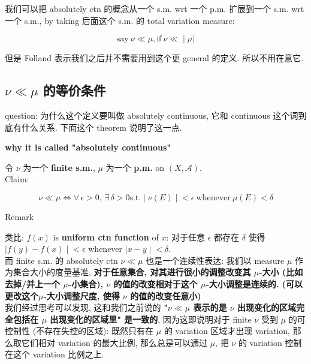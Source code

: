 \documentclass{qlnotes-export}
\begin{document}
我们可以把 absolutely ctn 的概念从一个 s.m. wrt 一个 p.m. 扩展到一个 s.m. wrt 一个 s.m., by taking 后面这个 s.m. 的 total variation measure:

\[\left. \text{say}\ \nu \ll \mu,\text{if}\ \nu \ll \middle| \mu| \right.\]

但是 Folland 表示我们之后并不需要用到这个更 general 的定义. 所以不用在意它.

\subsection{\texorpdfstring{\(\nu \ll \mu\) 的等价条件}{\textbackslash nu \textbackslash ll \textbackslash mu 的等价条件}}\label{nu-ll-mu-ux7684ux7b49ux4ef7ux6761ux4ef6}

question: 为什么这个定义要叫做 absolutely continuous, 它和 continuous 这个词到底有什么关系. 下面这个 theorem 说明了这一点.

\begin{theorem}{\protect{}\label{kn-why-it-is-called-absolutely-continuous}{\textbf{why
it is called "absolutely continuous"}}}

令 \(\nu\) 为一个 \textbf{finite s.m.}, \(\mu\) 为一个 \textbf{p.m.} on \((X,\mathcal{A})\).\\
Claim:

\[\left. \nu \ll \mu\Leftrightarrow\forall\,\epsilon > 0,\,\exists\,\delta > 0\text{s.t.} \middle| \nu(E) \middle| < \epsilon\ \text{whenever}\ \mu(E) < \delta \right.\]

\end{theorem}

\begin{qlremark}{Remark}

类比: \(f(x)\) is \textbf{uniform ctn function} of \(x\): 对于任意 \(\epsilon\) 都存在 \(\delta\) 使得 \(\left. |f(y) - f(x) \middle| < \epsilon \right.\) whenever \(\left. |x - y \middle| < \delta \right.\).\\
而 finite s.m. 的 absolutely ctn \(\nu \ll \mu\) 也是一个连续性表达: 我们以 measure \(\mu\) 作为集合大小的度量基准, \textbf{对于任意集合, 对其进行很小的调整改变其 \(\mu\)-大小 (比如去掉/并上一个 \(\mu\)-小集合), \(\nu\) 的值的改变相对于这个 \(\mu\)-大小调整是连续的. (可以更改这个\(\mu\)-大小调整尺度, 使得 \(\nu\) 的值的改变任意小)}\\
我们经过思考可以发现, 这和我们之前说的 \textbf{"\(\nu \ll \mu\) 表示的是 \(\nu\) 出现变化的区域完全包括在 \(\mu\) 出现变化的区域里" 是一致的}, 因为这即说明对于 finite \(\nu\) 受到 \(\mu\) 的可控制性 (不存在失控的区域): 既然只有在 \(\mu\) 的 variation 区域才出现 variation, 那么取它们相对 variation 的最大比例, 那么总是可以通过 \(\mu\), 把 \(\nu\) 的 variation 控制在这个 variation 比例之上.

\end{qlremark}
\end{document}
